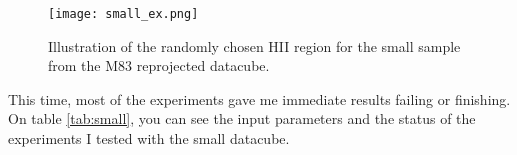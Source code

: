 \documentclass[11pt,fleqn]{book} %
\begin{document}
																																																																																																																																																																																																																																																																																	    \begin{figure}[h!]
																																																																																																																																																																																																																																																																																	    	\centering
																																																																																																																																																																																																																																																																																		    \texttt{[image: small\_ex.png]}
																																																																																																																																																																																																																																																																																		        \caption{Illustration of the randomly chosen HII region for the small sample from the M83 reprojected datacube.}
																																																																																																																																																																																																																																																																																			    \label{img:h2region}
																																																																																																																																																																																																																																																																																			    \end{figure}

																																																																																																																																																																																																																																																																																			    This time, most of the experiments gave me immediate results failing or finishing. On table \ref{tab:small}, you can see the input parameters and the status of the experiments I tested with the small datacube.
\end{document}
